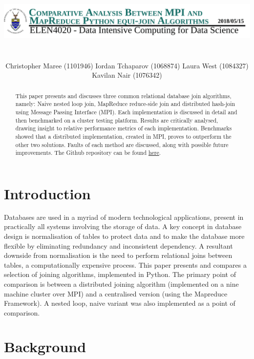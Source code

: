 \documentclass[10.5 pt, conference]{IEEEtran}
\title{\includegraphics[width=19.0cm]{Report_Title_cover.png}\vspace*{-0.2cm}}
\author{ \\ Christopher Maree (1101946) \text{    } Iordan Tchaparov (1068874)	\text{    }	 Laura West (1084327) \text{    }Kavilan Nair (1076342) }
\begin{document}
\maketitle
\thispagestyle{empty}
\pagestyle{plain}
\begin{abstract}
This paper presents and discusses three common relational database join algorithms, namely: Naive nested loop join, MapReduce reduce-side join and distributed hash-join using Message Passing Interface (MPI). Each implementation is discussed in detail and then benchmarked on a cluster testing platform. Results are critically analysed, drawing insight to relative performance metrics of each implementation. Benchmarks showed that a distributed implementation, created in MPI, proves to outperform the other two solutions. Faults of each method are discussed, along with possible future improvements. The Github repository can be found \href{https://github.com/data-intensive-computing-4020/Project}{here}.
\end{abstract}
\thispagestyle{empty}
\pagestyle{plain}
\section{Introduction}
Databases are used in a myriad of modern technological applications, present in practically all systems involving the storage of data. A key concept in database design is normalisation of tables to protect data and to make the database more flexible by eliminating redundancy and inconsistent dependency. A resultant downside from normalisation is the need to perform relational joins between tables, a computationally expensive process. This paper presents and compares a selection of joining algorithms, implemented in Python. The primary point of comparison is between a distributed joining algorithm (implemented on a nine machine cluster over MPI) and a centralised version (using the Mapreduce Framework). A nested loop, naive variant was also implemented as a point of comparison. 

\section{Background}
\end{document}

